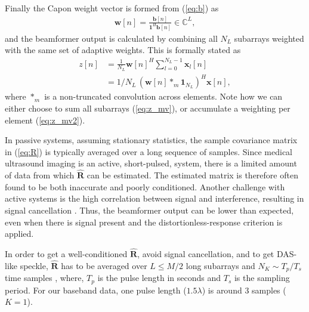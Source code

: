 \documentclass[journal]{IEEEtran}
\newcommand{\mat}[1]{\mathbf{#1}}
\renewcommand{\vec}[1]{\mathbf{#1}}
\begin{document}
Finally the Capon weight vector is formed from (\ref{eq:b}) as
\begin{align}\label{eq:w}
\vec{w}[n] = \frac{\vec{b}[n]}{\vec{1}^H\vec{b}[n]} \in \mathbb{C}^L,
\end{align}
and the beamformer output is calculated by combining all $N_L$ subarrays weighted with the same set of adaptive weights. This is formally stated as
\begin{align}
z[n] &= \frac{1}{N_L}\vec{w}[n]^H \sum_{l=0}^{N_L-1} \vec{x}_l[n] \label{eq:z_mv}\\
&= 1/N_L \, (\vec{w}[n] *_{m} \vec{1}_{N_L})^H\vec{x}[n] \label{eq:z_mv2},
\end{align}
where $*_m$ is a non-truncated convolution across elements.
Note how we can either choose to sum all subarrays (\ref{eq:z_mv}), or accumulate a weighting per element (\ref{eq:z_mv2}).

In passive systems, assuming stationary statistics, the sample covariance matrix in (\ref{eq:R}) is typically averaged over a long sequence of samples\cite{Krima}. Since medical ultrasound imaging is an active, short-pulsed, system, there is a limited amount of data from which $\mat{\hat{R}}$ can be estimated. The estimated matrix is therefore often found to be both inaccurate and poorly conditioned. Another challenge with active systems is the high correlation between signal and interference, resulting in signal cancellation \cite{Reddy1987}. Thus, the beamformer output can be lower than expected, even when there is signal present and the distortionless-response criterion is applied. 

In order to get a well-conditioned $\mat{\hat{R}}$, avoid signal cancellation, and to get DAS-like speckle, $\mat{\hat{R}}$ has to be averaged over $L\le M/2$ long subarrays and $N_K \sim T_p/T_s$ time samples \cite{Synnevag2007a}, where, $T_p$ is the pulse length in seconds and $T_s$ is the sampling period. For our baseband data, one pulse length ($1.5\lambda$) is around 3 samples ($K=1$).
\end{document}
